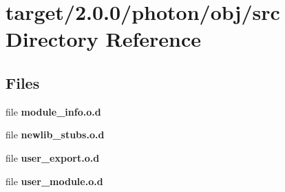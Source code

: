 \section{target/2.0.0/photon/obj/src Directory Reference}
\label{dir_d82f7a4e8d4468ec991762738af07248}
\subsection*{Files}
\begin{DoxyCompactItemize}
\item 
file \textbf{ module\+\_\+info.\+o.\+d}
\item 
file \textbf{ newlib\+\_\+stubs.\+o.\+d}
\item 
file \textbf{ user\+\_\+export.\+o.\+d}
\item 
file \textbf{ user\+\_\+module.\+o.\+d}
\end{DoxyCompactItemize}
